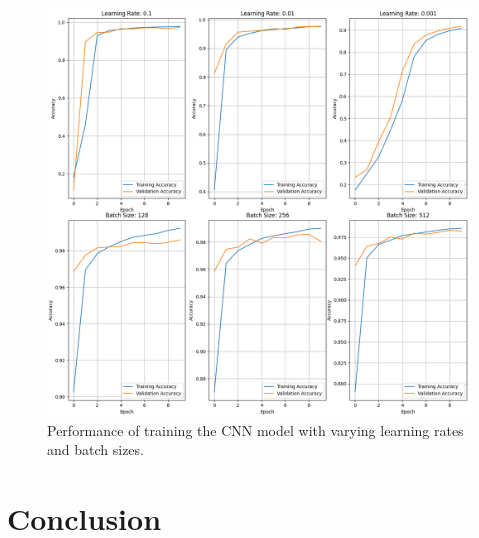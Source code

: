 \documentclass[a4paper]{article}
\begin{document}
\begin{figure}[h!]
    \centering
    \includegraphics[scale=0.4]{images/learning-rate-batch-size-cnn.png}
    \caption{Performance of training the CNN model with varying learning rates and batch sizes.}
    \label{fig:training-params}
\end{figure}


\newpage
\section{Conclusion}\label{conclusion}
\end{document}
